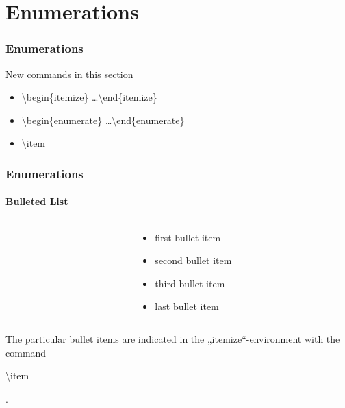 \section{Enumerations}
\begin{frame}
\frametitle{Enumerations}

\begin{block}{New commands in this section}
\begin{itemize}
\item \color{unibablueI}\textbackslash begin\color{black}\{itemize\} \ldots \color{unibablueI}\textbackslash end\color{black}\{itemize\} 
\item \color{unibablueI}\textbackslash begin\color{black}\{enumerate\} \ldots \color{unibablueI}\textbackslash end\color{black}\{enumerate\} 
\item \color{nounibaredI}\textbackslash item\color{black}
\end{itemize}
\end{block}
\end{frame}

\begin{frame}
\frametitle{Enumerations}
\framesubtitle{Bulleted List}

\begin{columns}
\begin{column}{.5\textwidth}
\begin{ttfamily}

\end{ttfamily}
\end{column}
\begin{column}{.5\textwidth}
\begin{itemize}
\item first bullet item
\item second bullet item
\item third bullet item
\item last  bullet item
\end{itemize}
\end{column}
\end{columns}
\bigskip

The particular bullet items are indicated in the „itemize“-environment with the command \begin{ttfamily}\color{nounibaredI}\textbackslash item\color{black}\end{ttfamily}.
\end{frame}

